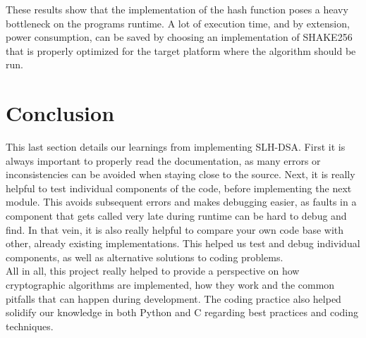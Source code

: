 \documentclass[journal=tosc,notanonymous]{iacrtrans}
\begin{document}
These results show that the implementation of the hash function poses a heavy bottleneck on the programs runtime.
A lot of execution time, and by extension, power consumption, can be saved by choosing an implementation of SHAKE256 that is properly optimized for the target platform where the algorithm should be run.

\section{Conclusion}

This last section details our learnings from implementing SLH-DSA.
First it is always important to properly read the documentation, as many errors or inconsistencies can be avoided when staying close to the source.
Next, it is really helpful to test individual components of the code, before implementing the next module.
This avoids subsequent errors and makes debugging easier, as faults in a component that gets called very late during runtime can be hard to debug and find.
In that vein, it is also really helpful to compare your own code base with other, already existing implementations.
This helped us test and debug individual components, as well as alternative solutions to coding problems.
\\
All in all, this project really helped to provide a perspective on how cryptographic algorithms are implemented, how they work and the common pitfalls that can happen during development.
The coding practice also helped solidify our knowledge in both Python and C regarding best practices and coding techniques.




\end{document}
